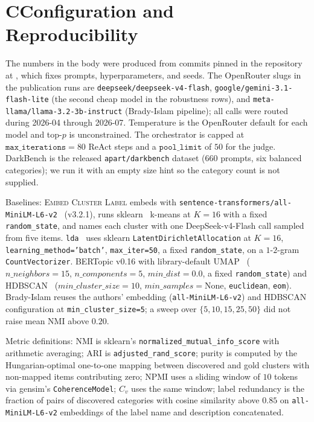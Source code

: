 \section*{C\quad Configuration and Reproducibility}
\label{app:repro}

The numbers in the body were produced from commits pinned in the
repository at \repourl{}, which fixes prompts, hyperparameters, and
seeds. The OpenRouter slugs in the publication runs are
\texttt{deepseek/deepseek-v4-flash},
\texttt{google/gemini-3.1-flash-lite} (the second cheap model in the
robustness rows), and
\texttt{meta-llama/llama-3.2-3b-instruct} (Brady-Islam pipeline); all
calls were routed during 2026-04 through 2026-07. Temperature is the
OpenRouter default for each model and top-$p$ is unconstrained. The
orchestrator is capped at $\texttt{max\_iterations}{=}80$ ReAct steps
and a $\texttt{pool\_limit}$ of $50$ for the judge. DarkBench is the
released \texttt{apart/darkbench} dataset (660 prompts, six balanced
categories); we run it with an empty size hint so the category count
is not supplied.

Baselines: \textsc{Embed Cluster Label} embeds with
\texttt{sentence-transformers/all-MiniLM-L6-v2}~\citep{reimers2019sbert} (v3.2.1), runs
sklearn~\citep{pedregosa2011sklearn} k-means at $K{=}16$ with a fixed \texttt{random\_state},
and names each cluster with one DeepSeek-v4-Flash call sampled from
five items. \texttt{lda}~\citep{blei2003lda} uses sklearn
\texttt{LatentDirichletAllocation} at
$K{=}16$, \texttt{learning\_method='batch'}, \texttt{max\_iter=50},
a fixed \texttt{random\_state}, on a $1$-$2$-gram \texttt{CountVectorizer}.
BERTopic v0.16 with library-default UMAP~\citep{mcinnes2018umap}
($n\_neighbors{=}15$, $n\_components{=}5$, $min\_dist{=}0.0$,
a fixed \texttt{random\_state}) and HDBSCAN~\citep{mcinnes2017hdbscan}
($min\_cluster\_size{=}10$, $min\_samples=$None,
\texttt{euclidean}, \texttt{eom}). Brady-Islam reuses the authors'
embedding (\texttt{all-MiniLM-L6-v2}) and HDBSCAN configuration at
\texttt{min\_cluster\_size=5}; a sweep over $\{5,10,15,25,50\}$ did
not raise mean NMI above $0.20$.

Metric definitions: NMI is sklearn's
\texttt{normalized\_mutual\_info\_score} with arithmetic averaging;
ARI is \texttt{adjusted\_rand\_score}; purity is computed by the
Hungarian-optimal one-to-one mapping between discovered and gold
clusters with non-mapped items contributing zero; NPMI uses a
sliding window of $10$ tokens via gensim's \texttt{CoherenceModel};
$C_v$ uses the same window; label redundancy is the fraction of
pairs of discovered categories with cosine similarity above $0.85$
on \texttt{all-MiniLM-L6-v2} embeddings of the label name and
description concatenated.

